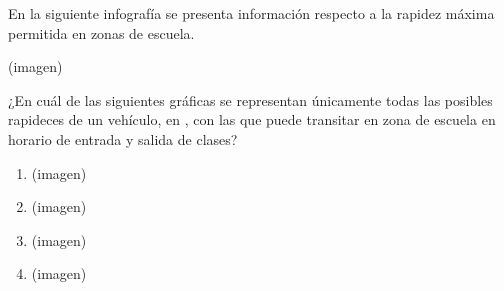 \begin{problem}
    En la siguiente infografía se presenta información respecto a la rapidez máxima permitida en zonas de escuela.

    \begin{center}
    (imagen)
    \end{center}

    ¿En cuál de las siguientes gráficas se representan únicamente todas las posibles rapideces de un vehículo, en , con las que puede transitar en zona de escuela en horario de entrada y salida de clases?

    \begin{enumerate}[label=\Alph*.]
        \item (imagen)
        \item (imagen)
        \item (imagen)
        \item (imagen)
    \end{enumerate}
\end{problem}
